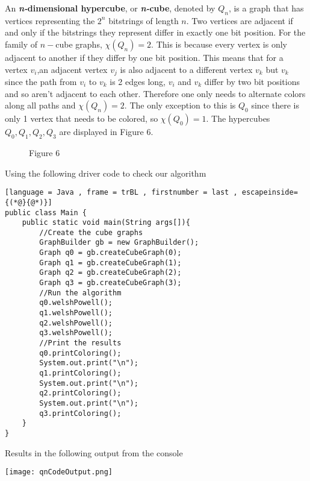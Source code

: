 \documentclass[12pt, letterpaper]{article}
\begin{document}
An \textbf{\textit{n-}dimensional hypercube}, or \textbf{\textit{n-}cube}, denoted by $Q_n$, is a graph that has vertices representing the $2^n$ bitstrings of length $n$. Two vertices are adjacent if and only if the bitstrings they represent differ in exactly one bit position. For the family of $n-$cube graphs, $\chi(Q_n)=2$. This is because every vertex is only adjacent to another if they differ by one bit position. This means that for a vertex $v_i$,an adjacent vertex $v_j$ is also adjacent to a different vertex $v_k$ but $v_k$ since the path from $v_i$ to $v_k$ is 2 edges long, $v_i$ and $v_k$ differ by two bit positions and so aren't adjacent to each other. Therefore one only needs to alternate colors along all paths and $\chi(Q_n)=2$. The only exception to this is $Q_0$ since there is only 1 vertex that needs to be colored, so $\chi(Q_0)=1$. The hypercubes $Q_0,Q_1,Q_2,Q_3$ are displayed in Figure 6.


\begin{figure}[h!]%
\begin{center}
	\qquad
	\qquad
	\qquad
	\caption*{Figure 6}
\end{center}
\end{figure}


Using the following driver code to check our algorithm


\begin{lstlisting}[language = Java , frame = trBL , firstnumber = last , escapeinside={(*@}{@*)}]
public class Main {
    public static void main(String args[]){
        //Create the cube graphs
        GraphBuilder gb = new GraphBuilder();
        Graph q0 = gb.createCubeGraph(0);
        Graph q1 = gb.createCubeGraph(1);
        Graph q2 = gb.createCubeGraph(2);
        Graph q3 = gb.createCubeGraph(3);
        //Run the algorithm
        q0.welshPowell();
        q1.welshPowell();
        q2.welshPowell();
        q3.welshPowell();
        //Print the results
        q0.printColoring();
        System.out.print("\n");
        q1.printColoring();
        System.out.print("\n");
        q2.printColoring();
        System.out.print("\n");
        q3.printColoring();
    }
}
\end{lstlisting}


Results in the following output from the console


\begin{center}
\texttt{[image: qnCodeOutput.png]}
\end{center}
\end{document}
